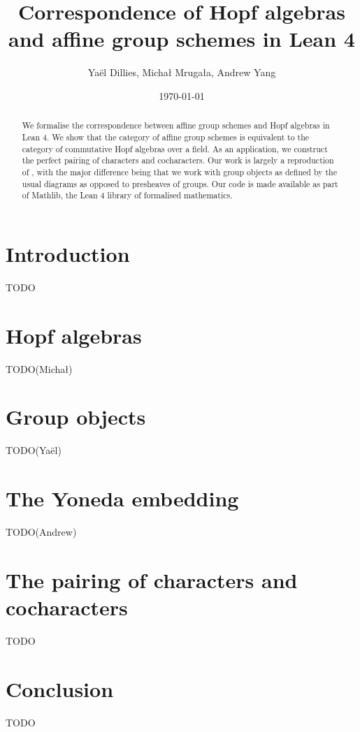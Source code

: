 \documentclass{article}
\title{Correspondence of Hopf algebras and affine group schemes in Lean 4}
\author{Yaël Dillies, Michał Mrugała, Andrew Yang}
\date{\today}
\begin{document}
\maketitle
\thispagestyle{fancy}
\renewcommand{\footrulewidth}{0.4pt}


\begin{abstract}
  We formalise the correspondence between affine group schemes and Hopf algebras in Lean 4.
  We show that the category of affine group schemes is equivalent to the category of commutative Hopf algebras over a field.
  As an application, we construct the perfect pairing of characters and cocharacters.
  Our work is largely a reproduction of \cite{CrazyAffine}, with the major difference being that we work with group objects as defined by the usual diagrams as opposed to presheaves of groups.
  Our code is made available as part of Mathlib, the Lean 4 library of formalised mathematics.
\end{abstract}


\section{Introduction}\label{sec:intro}


TODO


\section{Hopf algebras}\label{sec:hopf}


TODO(Michał)


\section{Group objects}\label{sec:grp}


TODO(Yaël)


\section{The Yoneda embedding}\label{sec:yoneda}


TODO(Andrew)


\section{The pairing of characters and cocharacters}\label{sec:char-cochar}


TODO


\section{Conclusion}\label{sec:conclusion}


TODO




\end{document}
